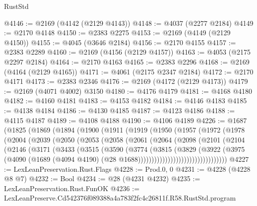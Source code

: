 \begin{lexlean}{RustStd}
\begin{coremodule}
@4146 := @2169 (@4142 (@2129 @4143))
@4148 := @4037 (@2277 @2184)
@4149 := @2170 @4148
@4150 := @2383 @2275
@4153 := @2169 (@4149 (@2129 @4150))
@4155 := @4045 (@3646 @2184)
@4156 := @2170 @4155
@4157 := @2383 @2289
@4160 := @2169 (@4156 (@2129 @4157))
@4163 := @4053 (@2175 @2297 @2184)
@4164 := @2170 @4163
@4165 := @2383 @2296
@4168 := @2169 (@4164 (@2129 @4165))
@4171 := @4061 (@2175 @2347 @2184)
@4172 := @2170 @4171
@4173 := @2383 @2346
@4176 := @2169 (@4172 (@2129 @4173))
@4179 := @2169 (@4071 @4002) @3150
@4180 := @4176 @4179
@4181 := @4168 @4180
@4182 := @4160 @4181
@4183 := @4153 @4182
@4184 := @4146 @4183
@4185 := @4138 @4184
@4186 := @4130 @4185
@4187 := @4123 @4186
@4188 := @4115 @4187
@4189 := @4108 @4188
@4190 := @4106 @4189
@4226 := @1687
    (@1825
      (@1869
        (@1894
          (@1900
            (@1911
              (@1919
                (@1950
                  (@1957
                    (@1972
                      (@1978
                        (@2004
                          (@2039
                            (@2050
                              (@2053
                                (@2058
                                  (@2061
                                    (@2064
                                      (@2098
                                        (@2101
                                          (@2104
                                            (@2146
                                              (@3171
                                                (@3433
                                                  (@3515
                                                    (@3590
                                                      (@3774
                                                        (@3815
                                                          (@3829
                                                            (@3922
                                                              (@3975
                                                                (@4090
                                                                  (@1689
                                                                    (@4094 @4190)
                                                                    (@28
                                                                      @1688)))))))))))))))))))))))))))))))))
@4227 := LexLeanPreservation.Rust.Flags
@4228 := Prod.{0, 0}
@4231 := @4228 (@4228 @8 @7)
@4232 := Bool
@4234 := @28 (@4231 @4232)
@4235 := LexLeanPreservation.Rust.FunOK
@4236 := LexLeanPreserve.Cd542376f089388a4a783f2fc4c26811f.R58.RustStd.program

\end{coremodule}
\end{lexlean}
